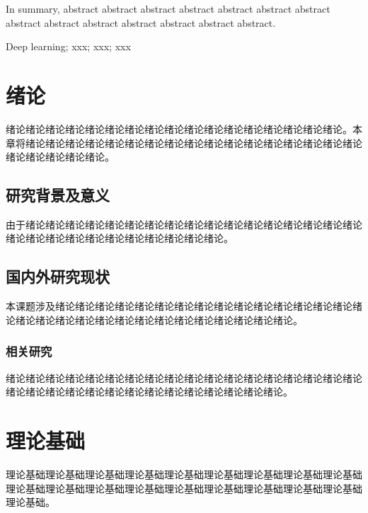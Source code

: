 \documentclass[UTF-8,a4paper,twoside]{article}
\numberwithin{equation}{section} %
\numberwithin{table}{section} %
\numberwithin{figure}{section} %
\begin{document}
In summary, abstract abstract abstract abstract abstract abstract abstract abstract abstract abstract abstract abstract abstract abstract.

\noindent{}Deep learning; xxx; xxx; xxx

\newpage
\thispagestyle{pre}
\begin{center}
	\tableofcontents
\end{center}
\thispagestyle{pre}

\newpage
\pagestyle{main}
\setcounter{page}{1}
\section{绪论}
绪论绪论绪论绪论绪论绪论绪论绪论绪论绪论绪论绪论绪论绪论绪论绪论绪论。本章将绪论绪论绪论绪论绪论绪论绪论绪论绪论绪论绪论绪论绪论绪论绪论绪论绪论绪论绪论绪论绪论绪论。

\subsection{研究背景及意义}
由于绪论\cite{cbam}绪论绪论绪论绪论绪论绪论绪论绪论绪论绪论\cite{公安联网标准}绪论绪论绪论绪论绪论绪论绪论绪论绪论绪论绪论绪论绪论绪论绪论绪论绪论。

\subsection{国内外研究现状}
本课题涉及绪论绪论绪论\cite{廖云飞}绪论绪论绪论绪论绪论绪论绪论绪论绪论\cite{渣土车未苫盖检测}绪论绪论绪论绪论绪论绪论绪论绪论绪论绪论绪论绪论绪论绪论绪论绪论绪论绪论。

\subsubsection{相关研究}
绪论绪论绪论绪论绪论绪论绪论绪论\cite{duchi2011adaptive}绪论绪论绪论绪论绪论绪论绪论绪论绪论绪论绪论\cite{kingma2014adam}绪论绪论绪论绪论绪论绪论绪论绪论绪论绪论绪论绪论绪论。

\newpage
\section{理论基础}
理论基础理论基础理论基础理论基础理论基础理\cite{lee2021mlcourse}论基础理论基础理论基础理论基础理论基础理论基础理论基础理论基础理论基础理论基础理论基础理论基础理论基础理论基础。
\end{document}
